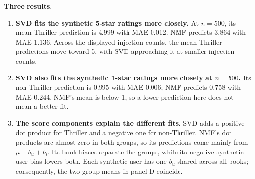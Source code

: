 \documentclass[10pt]{article}
\begin{document}
\begin{minipage}[t]{0.51\textwidth}
\textbf{Three results.}
\begin{enumerate}[leftmargin=*,itemsep=3pt,topsep=3pt]
\item \textbf{SVD fits the synthetic 5-star ratings more closely.} At $n=500$, its mean Thriller prediction is 4.999 with MAE 0.012. NMF predicts 3.864 with MAE 1.136. Across the displayed injection counts, the mean Thriller predictions move toward 5, with SVD approaching it at smaller injection counts.
\item \textbf{SVD also fits the synthetic 1-star ratings more closely at $n=500$.} Its non-Thriller prediction is 0.995 with MAE 0.006; NMF predicts 0.758 with MAE 0.244. NMF's mean is below 1, so a lower prediction here does not mean a better fit.
\item \textbf{The score components explain the different fits.} SVD adds a positive dot product for Thriller and a negative one for non-Thriller. NMF's dot products are almost zero in both groups, so its predictions come mainly from $\mu+b_u+b_i$. Its book biases separate the groups, while its negative synthetic-user bias lowers both. Each synthetic user has one $b_u$ shared across all books; consequently, the two group means in panel D coincide.
\end{enumerate}
\end{minipage}
\end{document}
